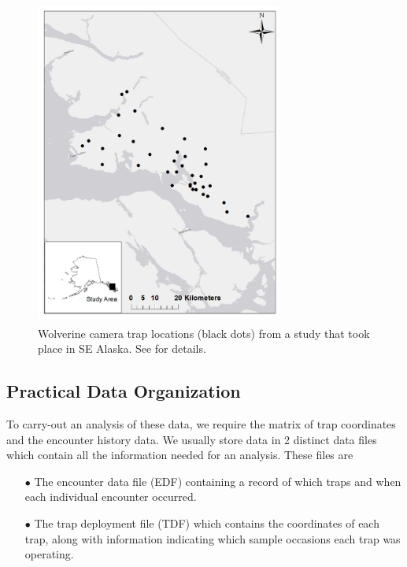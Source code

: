 \begin{figure}[ht]
\begin{center}
\includegraphics[height=4.22in,width=3.2in]{Ch4-SCR0/figs/Wolverines_cameratrap}
\end{center}
\caption{
Wolverine camera trap locations (black dots) from a study that took
place in SE Alaska. See
\citet{magoun_etal:2011} for details.
}
\label{scr0.fig.wolverinelocs}
\end{figure}


\subsection{Practical Data Organization}

To carry-out an analysis of these data, we require the matrix of trap
coordinates and the encounter history data.  We usually store data in
2 distinct data files which contain all the information needed for an
analysis. These files are
\begin{itemize}
\item[$\bullet$] The encounter data file (EDF) containing a record of which
  traps and when each individual encounter occurred.
\item[$\bullet$] The trap deployment file (TDF) which contains the
  coordinates of each trap, along with information
 indicating which sample
  occasions each trap was operating.
\end{itemize}

